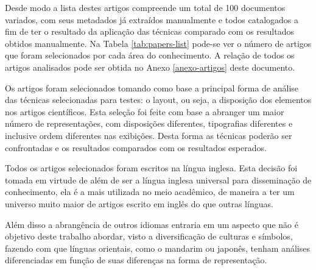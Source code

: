 
Desde modo a lista destes artigos compreende um total de 100 documentos variados, com seus metadados já extraídos manualmente e todos catalogados a fim de ter o resultado da aplicação das técnicas comparado com os resultados obtidos manualmente. Na Tabela \ref{tab:papers-list} pode-se ver o número de artigos que foram selecionados por cada área do conhecimento. A relação de todos os artigos analisados pode ser obtida no Anexo \ref{anexo-artigos} deste documento.

Os artigos foram selecionados tomando como base a principal forma de análise das técnicas selecionadas para testes: o layout, ou seja, a disposição dos elementos nos artigos científicos. Esta seleção foi feite com base a abranger um maior número de representações, com disposições diferentes, tipografias diferentes e inclusive ordem diferentes nas exibições. Desta forma as técnicas poderão ser confrontadas e os resultados comparados com os resultados esperados.


Todos os artigos selecionados foram escritos na língua inglesa. Esta decisão foi tomada em virtude de além de ser a língua inglesa universal para disseminação de conhecimento, ela é a mais utilizada no meio acadêmico, de maneira a ter um universo muito maior de artigos escrito em inglês do que outras línguas.

Além disso a abrangência de outros idiomas entraria em um aspecto que não é objetivo deste trabalho abordar, visto a diversificação de culturas e símbolos, fazendo com que línguas orientais, como o mandarim ou japonês, tenham análises diferenciadas em função de suas diferenças na forma de representação.

